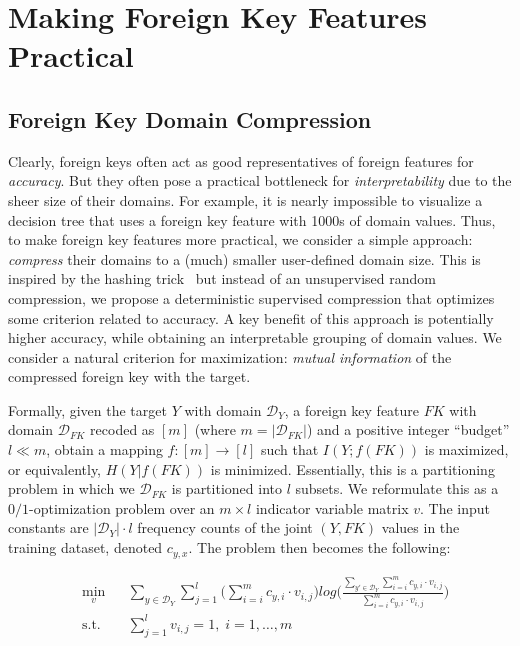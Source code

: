 \documentclass[sigconf]{acmart}
\begin{document}
\section{Making Foreign Key Features Practical}

\subsection{Foreign Key Domain Compression}

Clearly, foreign keys often act as good representatives of foreign features for \textit{accuracy}.
But they often pose a practical bottleneck for \textit{interpretability} due to the sheer size of their domains.
For example, it is nearly impossible to visualize a decision tree that uses a foreign key feature with 1000s of domain values.
Thus, to make foreign key features more practical, we consider a simple approach: \textit{compress} their domains to a (much) smaller 
user-defined domain size. This is inspired by the hashing trick~\cite{hashingtrick} but instead of an unsupervised random 
compression, we propose a deterministic supervised compression that optimizes some criterion related to accuracy. A key benefit of 
this approach is potentially higher accuracy, while obtaining an interpretable grouping of domain values.
We consider a natural criterion for maximization: \textit{mutual information} of the compressed foreign key with the target.

Formally, given the target $Y$ with domain $\mathcal{D}_Y$, a foreign key feature $FK$ with domain $\mathcal{D}_{FK}$ recoded as $[m]$ 
(where $m = |\mathcal{D}_{FK}|$) and a positive integer ``budget'' $l \ll m$, obtain a mapping $f: [m] \rightarrow [l]$ such that $I(Y; f(FK))$ is maximized,
or equivalently, $H(Y|f(FK))$ is minimized. Essentially, this is a partitioning problem in which we $\mathcal{D}_{FK}$ is partitioned into $l$ subsets. 
We reformulate this as a $0/1$-optimization problem over an $m \times l$ indicator variable matrix $v$.
The input constants are $|\mathcal{D}_Y| \cdot l$ frequency counts of the joint $(Y, FK)$ values in the training dataset, denoted $c_{y, x}$.
The problem then becomes the following:

\begin{equation*}
\begin{aligned}
& \underset{v}{\text{min}}
& & \sum_{y \in \mathcal{D}_Y} \sum_{j=1}^l \bigg(\sum_{i=i}^m c_{y,i} \cdot v_{i,j} \bigg) log \bigg(\frac{\sum_{y' \in \mathcal{D}_Y} \sum_{i=i}^m c_{y,i} \cdot v_{i,j}}{\sum_{i=i}^m c_{y,i} \cdot v_{i,j}}\bigg) \\
& \text{s.t.}
& & \sum_{j=1}^l v_{i,j} = 1, \; i = 1, \ldots, m
\end{aligned}
\end{equation*}
\end{document}
